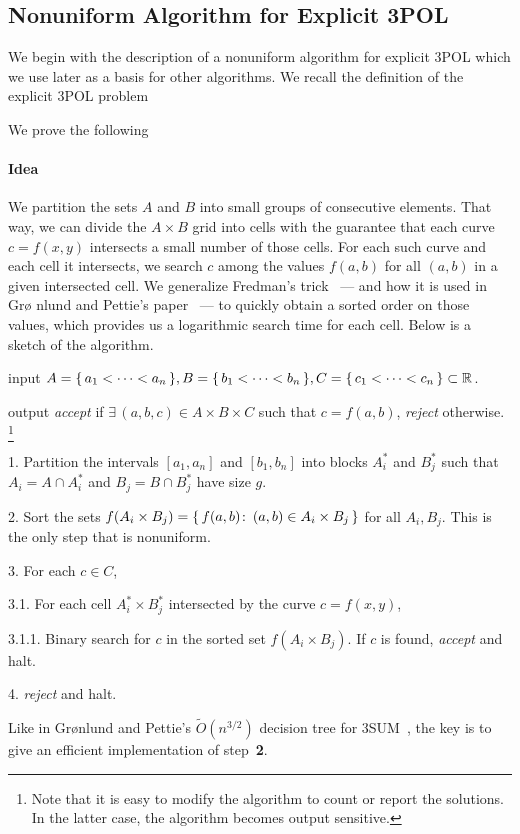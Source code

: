 \subsection{Nonuniform Algorithm for Explicit 3POL}%
\label{sec:algo:explicit:nonuniform}

We begin with the description of a nonuniform algorithm for explicit 3POL which
we use later as a basis for other algorithms.
%
We recall the definition of the explicit 3POL problem
%
\restate{\ProblemPOLExplicit*}

We prove the following
\restate{\TheoremPOLNonuniformExplicit*}

\paragraph{Idea}
We partition the sets $A$ and $B$ into small groups of consecutive
elements. That way, we can divide the $A\times B$ grid into cells with the
guarantee that each curve $c = f(x,y)$ intersects a small number
of those cells. For each such curve and each cell it intersects, we
search $c$ among the values $f(a,b)$ for all $(a,b)$ in a given intersected
cell. We generalize Fredman's trick~\cite{Fr76} --- and how it is used in Gr\o
nlund and Pettie's paper~\cite{GP18} --- to quickly obtain a sorted order on
those values, which provides us a logarithmic search time for each cell.
Below is a sketch of the algorithm.
\begin{algorithm}\label{algo:ne}
\item[input] $A = \{\,a_1 < \cdots < a_n\,\},B = \{\,b_1<\cdots<b_n\,\},\\
    C = \{\,c_1<\cdots<c_n\,\}
    \subset \mathbb{R}$.
\item[output] \emph{accept} if $\exists\, (a,b,c) \in A \times B \times C$ such that $c
    = f(a,b)$, \emph{reject} otherwise.%
    \footnote{Note that it is easy to modify the algorithm to count or report the
    solutions. In the latter case, the algorithm becomes output sensitive.}
\item[1.] Partition the intervals $[a_1,a_n]$ and $[b_1,b_n]$ into blocks
    $A_i^*$ and $B_j^*$ such that $A_i = A \cap A_i^*$ and $B_j = B
    \cap B_j^*$ have size $g$.
\item[2.] Sort the sets $f(A_i \times B_j) = \{\, f(a,b) \colon\, (a,b) \in A_i
    \times B_j\,\}$ for all $A_i,B_j$. This is the only step that
    is nonuniform.
\item[3.] For each $c \in C$,
\item[3.1.] For each cell $A_i^* \times B_j^*$ intersected by the curve
$c=f(x,y)$,
\item[3.1.1.] Binary search for $c$ in the sorted set $f(A_i \times B_j)$.
If $c$ is found, \emph{accept} and halt.
\item[4.] \emph{reject} and halt.
\end{algorithm}
%
Like in Gr\o nlund and Pettie's $\tilde{O}(n^{3/2})$ decision tree for
3SUM~\cite{GP18}, the key is to give an efficient implementation
of step~\textbf{2}.

